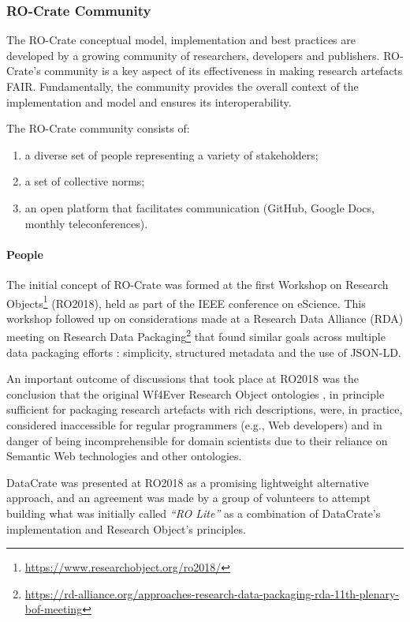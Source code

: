 \subsubsection{RO-Crate Community}\label{ch5:community}

The RO-Crate conceptual model, implementation and best practices are
developed by a growing community of researchers, developers and
publishers. RO-Crate's community is a key aspect of its effectiveness in
making research artefacts FAIR. Fundamentally, the community provides
the overall context of the implementation and model and ensures its
interoperability.

The RO-Crate community consists of:

\begin{enumerate}
\item
  a diverse set of people representing a variety of stakeholders;
\item
  a set of collective norms;
\item
  an open platform that facilitates communication (GitHub, Google Docs,
  monthly teleconferences).
\end{enumerate}

\hypertarget{people}{%
\paragraph{People}\label{ch5:people}}

The initial concept of RO-Crate was formed at the first Workshop on
Research Objects\footnote{\url{https://www.researchobject.org/ro2018/}} (RO2018),
held as part of the IEEE conference on eScience. This workshop followed
up on considerations made at a Research Data Alliance (RDA) meeting on
Research Data
Packaging\footnote{\url{https://rd-alliance.org/approaches-research-data-packaging-rda-11th-plenary-bof-meeting}}
that found similar goals across multiple data packaging efforts
\cite{OCarragain 2019}: simplicity, structured metadata and the
use of JSON-LD.

An important outcome of discussions that took place at RO2018 was the
conclusion that the original Wf4Ever Research Object ontologies
\cite{Belhajjame 2015}, in
principle sufficient for packaging research artefacts with rich
descriptions, were, in practice, considered inaccessible for regular
programmers (e.g., Web developers) and in danger of being
incomprehensible for domain scientists due to their reliance on Semantic
Web technologies and other ontologies.

DataCrate \cite{Sefton 2018} was
presented at RO2018 as a promising lightweight alternative approach, and
an agreement was made by a group of volunteers to attempt building what
was initially called \emph{``RO Lite''} as a combination of DataCrate's
implementation and Research Object's principles.

